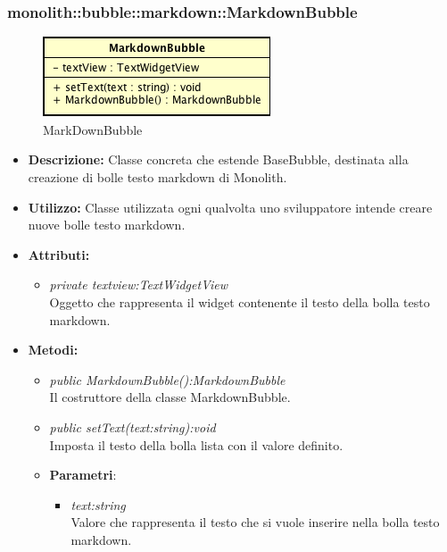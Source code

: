 \subsubsection{monolith::bubble::markdown::MarkdownBubble}

\label{monolith::bubble::markdown::MarkdownBubble}
\begin{figure}[ht]
	\centering
	\includegraphics[scale=0.5]{Sezioni/SottosezioniST/img/MarkdownBubble.png}
	\caption{MarkDownBubble}
\end{figure}

\begin{itemize}
\item \textbf{Descrizione:} Classe concreta che estende BaseBubble, destinata alla creazione di bolle testo markdown di Monolith.
\item \textbf{Utilizzo:} Classe utilizzata ogni qualvolta uno sviluppatore intende creare nuove bolle testo markdown.
\item \textbf{Attributi:}
\begin{itemize}
\item \textit{private textview:TextWidgetView}\\
Oggetto che rappresenta il widget contenente il testo della bolla testo markdown.
\end{itemize}
\item \textbf{Metodi:}
\begin{itemize}
\item \textit{public MarkdownBubble():MarkdownBubble}\\
Il costruttore della classe MarkdownBubble.
\item \textit{public setText(text:string):void}\\
Imposta il testo della bolla lista con il valore definito.
\item{\textbf{Parametri}: \begin{itemize}
\item \textit{text:string}\\
Valore che rappresenta il testo che si vuole inserire nella bolla testo markdown.
\end{itemize}}
\end{itemize}
\end{itemize}

